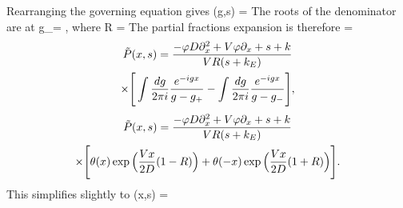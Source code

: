 Rearranging the governing equation gives
\be {}(g,s) = \DIFaddbegin {}\DIFaddend \ee
The roots of the denominator are at
\be g_\pm = \Big[ 1  \pm R \Big],\ee
where
\be R = \DIFaddbegin {}\DIFaddend \ee
The partial fractions expansion is therefore
\be {} = \DIFaddbegin \DIFadd{,}\DIFaddend \ee
\DIFaddbegin {}\begin{multline} \tilde{P}(x,s) = \frac{-\varphi D\partial_x^2 + V\varphi\partial_x + s + k}{VR(s+k_E)} \\ \times \Bigg[ \int \frac{dg}{2\pi i}\frac{e^{-igx}}{g-g_+} - \int \frac{dg}{2\pi i}\frac{e^{-igx}}{g-g_-}\Bigg],\end{multline}
\begin{multline}
 \tilde{P}(x,s) = \frac{-\varphi D\partial_x^2 + V\varphi \partial_x + s + k}{VR(s+k_E)} \\ \times \Bigg[ \theta(x) \exp\Big(\frac{Vx}{2D}(1-R)\Big) + \theta(-x)\exp\Big( \frac{Vx}{2D}(1+R)\Big) \Bigg].\end{multline}
\DIFaddend This simplifies slightly to
\be {}(x,s) = \exp{} \DIFdelbegin \DIFdel{, }\DIFdelend \label{eq:laplaceapp}\DIFaddbegin {}\DIFaddend \ee
\DIFdelbegin {}\DIFdelend 

